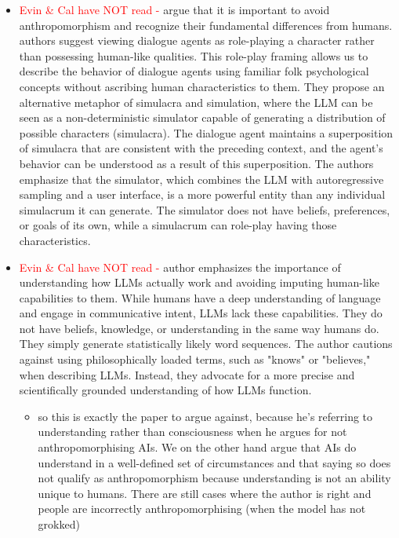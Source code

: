 \documentclass{article}
\begin{document}
\begin{itemize}
\begin{itemize}
        \item \textcolor{red}{Evin \& Cal have NOT read - } \cite{shanahan2023role} argue that it is important to avoid anthropomorphism and recognize their fundamental differences from humans. authors suggest viewing dialogue agents as role-playing a character rather than possessing human-like qualities. This role-play framing allows us to describe the behavior of dialogue agents using familiar folk psychological concepts without ascribing human characteristics to them. They propose an alternative metaphor of simulacra and simulation, where the LLM can be seen as a non-deterministic simulator capable of generating a distribution of possible characters (simulacra). The dialogue agent maintains a superposition of simulacra that are consistent with the preceding context, and the agent's behavior can be understood as a result of this superposition. The authors emphasize that the simulator, which combines the LLM with autoregressive sampling and a user interface, is a more powerful entity than any individual simulacrum it can generate. The simulator does not have beliefs, preferences, or goals of its own, while a simulacrum can role-play having those characteristics.
        \item \textcolor{red}{Evin \& Cal have NOT read - } \cite{shanahan2022talking} author emphasizes the importance of understanding how LLMs actually work and avoiding imputing human-like capabilities to them. While humans have a deep understanding of language and engage in communicative intent, LLMs lack these capabilities. They do not have beliefs, knowledge, or understanding in the same way humans do. They simply generate statistically likely word sequences. The author cautions against using philosophically loaded terms, such as "knows" or "believes," when describing LLMs. Instead, they advocate for a more precise and scientifically grounded understanding of how LLMs function.
        \begin{itemize}
            \item so this is exactly the paper to argue against, because he's referring to understanding rather than consciousness when he argues for not anthropomorphising AIs. We on the other hand argue that AIs do understand in a well-defined set of circumstances and that saying so does not qualify as anthropomorphism because understanding is not an ability unique to humans. There are still cases where the author is right and people are incorrectly anthropomorphising (when the model has not grokked)
        \end{itemize}

\end{itemize}
\end{itemize}
\end{document}
